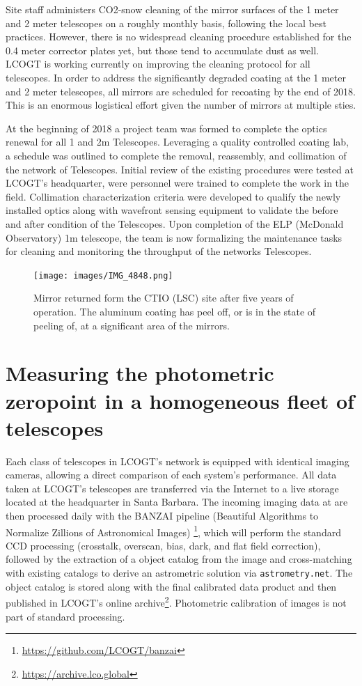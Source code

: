 \documentclass[draft]{spieman}
\begin{document}
Site staff administers CO2-snow cleaning of the mirror surfaces of the 1 meter and 2 meter
telescopes on a roughly monthly basis, following the local best practices. However, there is no 
widespread cleaning procedure established for the 0.4 meter corrector plates yet, but those tend
to accumulate dust as well. LCOGT is working currently on improving the cleaning protocol for all
telescopes. In order to address the significantly degraded coating at the 1 meter and 2 meter
telescopes, all mirrors are scheduled for recoating by the end of 2018. This is an enormous
logistical effort given the number of mirrors at multiple sties.

At the beginning of 2018 a project team was formed to complete the optics renewal for all 1 and
2m Telescopes.  Leveraging a quality controlled coating lab, a schedule was outlined to complete
the removal, reassembly, and collimation of the network of Telescopes.  Initial review of the
existing procedures were tested at LCOGT's headquarter, were personnel were trained to complete the
work in the field.  Collimation characterization criteria were developed to qualify the newly
installed optics along with wavefront sensing equipment to validate the before and after condition
of the Telescopes.  Upon completion of the ELP (McDonald Observatory) 1m telescope, the team is now
formalizing the maintenance tasks for cleaning and monitoring the throughput of the networks 
Telescopes.

\begin{figure}
\texttt{[image: images/IMG\_4848.png]}
\caption{\label{fig_mirrorpeel} Mirror returned form the CTIO (LSC) site after five years of
operation. The aluminum coating has peel off, or is in the state of peeling of, at a significant
area of the mirrors. }
\end{figure}


\section{Measuring the photometric zeropoint in a homogeneous fleet of telescopes}


Each class of telescopes in LCOGT's network is equipped with identical imaging cameras, allowing a
direct comparison of each system's performance. All data taken at LCOGT's telescopes are transferred
via the Internet to a live storage located at the headquarter in Santa Barbara. The incoming imaging
data at are then processed daily with the BANZAI pipeline (Beautiful Algorithms to Normalize
Zillions of Astronomical Images) \cite{mccully2018}\footnote{\url{https://github.com/LCOGT/banzai}},
which will perform the standard CCD processing (crosstalk, overscan, bias, dark, and flat field
correction), followed by the extraction of a object catalog from the image and cross-matching with
existing catalogs to derive an astrometric solution via {\tt astrometry.net}\cite{lang2010}. The
object catalog is stored along with the final calibrated data product and then published in LCOGT's
online archive\footnote{\url{https://archive.lco.global}}. Photometric calibration of images is not
part of standard processing.
\end{document}
